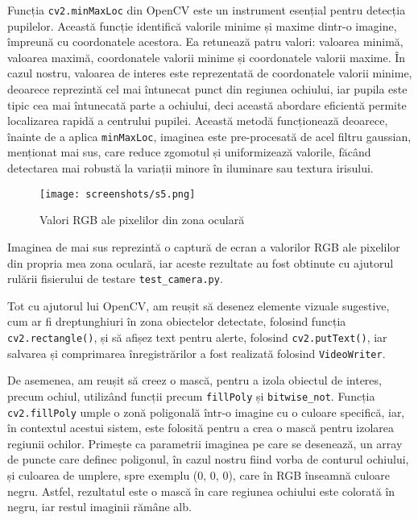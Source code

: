 \documentclass[12pt,a4paper]{article}
\begin{document}
Funcția \texttt{cv2.minMaxLoc} din OpenCV este un instrument esențial pentru
detecția pupilelor. Această funcție identifică valorile minime și maxime
dintr-o imagine, împreună cu coordonatele acestora. Ea retunează patru
valori: valoarea minimă, valoarea maximă, coordonatele valorii minime și
coordonatele valorii maxime. În cazul nostru, valoarea de interes este
reprezentată de coordonatele valorii minime, deoarece reprezintă cel mai
întunecat punct din regiunea ochiului, iar pupila este tipic cea mai
întunecată parte a ochiului, deci această abordare eficientă permite
localizarea rapidă a centrului pupilei. Această metodă funcționează
deoarece, înainte de a aplica \texttt{minMaxLoc}, imaginea este pre-procesată de
acel filtru gaussian, menționat mai sus, care reduce zgomotul și
uniformizează valorile, făcând detectarea mai robustă la variații minore
în iluminare sau textura irisului.

\begin{figure}[H]
    \centering
    \texttt{[image: screenshots/s5.png]}
    \caption{Valori RGB ale pixelilor din zona oculară}
    \label{fig:rgb_ochi}
\end{figure}

Imaginea de mai sus reprezintă o captură de ecran a valorilor RGB ale
pixelilor din propria mea zona oculară, iar aceste rezultate au fost obtinute cu ajutorul rulării fisierului de testare \texttt{test\_camera.py}.


Tot cu ajutorul lui OpenCV, am reușit să desenez elemente vizuale
sugestive, cum ar fi dreptunghiuri în zona obiectelor detectate,
folosind funcția \texttt{cv2.rectangle()}, și să afișez text pentru alerte,
folosind \texttt{cv2.putText()}, iar salvarea și comprimarea înregistrărilor a
fost realizată folosind \texttt{VideoWriter}.

De asemenea, am reușit să creez o mască, pentru a izola obiectul de
interes, precum ochiul, utilizând funcții precum \texttt{fillPoly} și
\texttt{bitwise\_not}. Funcția \texttt{cv2.fillPoly} umple o zonă poligonală într-o imagine
cu o culoare specifică, iar, în contextul acestui sistem, este folosită
pentru a crea o mască pentru izolarea regiunii ochilor. Primește ca
parametrii imaginea pe care se desenează, un array de puncte care
definec poligonul, în cazul nostru fiind vorba de conturul ochiului, și
culoarea de umplere, spre exemplu (0, 0, 0), care în RGB înseamnă
culoare negru. Astfel, rezultatul este o mască în care regiunea ochiului
este colorată în negru, iar restul imaginii rămâne alb.
\end{document}
